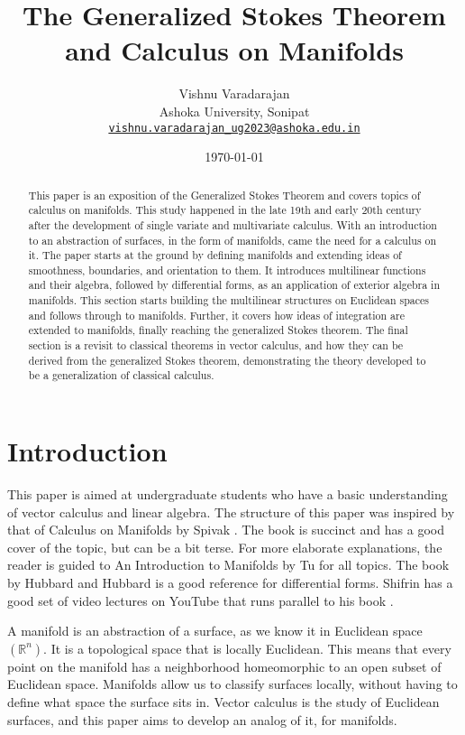 \documentclass{article}
\title{\textbf{The Generalized Stokes Theorem and Calculus on Manifolds}}
\author{Vishnu Varadarajan
\\
Ashoka University, Sonipat\\
\href{mailto:vishnu.varadarajan\_ug2023@ashoka.edu.in}{\tt vishnu.varadarajan\_ug2023@ashoka.edu.in}}
\date{\today}
\theoremstyle{definition}
\theoremstyle{named}
\begin{document}
\maketitle

\begin{abstract}
This paper is an exposition of the Generalized Stokes Theorem and covers topics of calculus on manifolds. This study happened in the late 19th and early 20th century after the development of single variate and multivariate calculus. With an introduction to an abstraction of surfaces, in the form of manifolds, came the need for a calculus on it. The paper starts at the ground by defining manifolds and extending ideas of smoothness, boundaries, and orientation to them. It introduces multilinear functions and their algebra, followed by differential forms, as an application of exterior algebra in manifolds. This section starts building the multilinear structures on Euclidean spaces and follows through to manifolds. Further, it covers how ideas of integration are extended to manifolds, finally reaching the generalized Stokes theorem. The final section is a revisit to classical theorems in vector calculus, and how they can be derived from the generalized Stokes theorem, demonstrating the theory developed to be a generalization of classical calculus.
\end{abstract}


\section{Introduction}
This paper is aimed at undergraduate students who have a basic understanding of vector calculus and linear algebra. The structure of this paper was inspired by that of Calculus on Manifolds by Spivak \cite{spivak1971calculus}. The book is succinct and has a good cover of the topic, but can be a bit terse. For more elaborate explanations, the reader is guided to An Introduction to Manifolds by Tu \cite{tu2010introduction} for all topics. The book by Hubbard and Hubbard \cite{hubbard2009vector} is a good reference for differential forms. Shifrin has a good set of video lectures on YouTube \cite{formsplaylist} that runs parallel to his book \cite{shifrin2004multivariable}.

A manifold is an abstraction of a surface, as we know it in Euclidean space $(\mathbb{R}^n)$. It is a topological space that is locally Euclidean. This means that every point on the manifold has a neighborhood homeomorphic to an open subset of Euclidean space. Manifolds allow us to classify surfaces locally, without having to define what space the surface sits in. Vector calculus is the study of Euclidean surfaces, and this paper aims to develop an analog of it, for manifolds.
\end{document}
